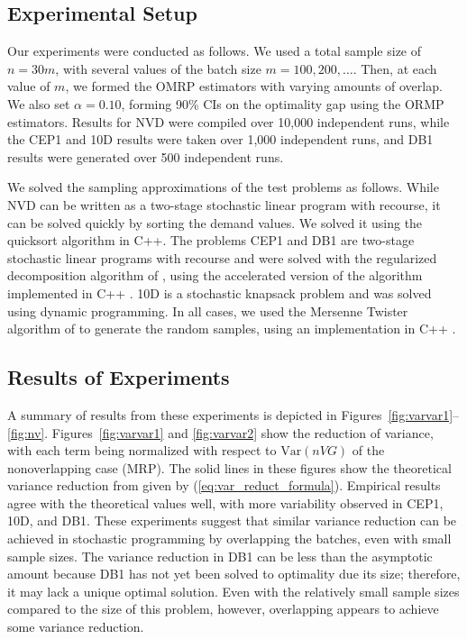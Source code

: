 \documentclass[12pt]{article}
\newcommand{\var}[1]{\mathrm{Var} \left( #1 \right)}
\begin{document}
\subsection{Experimental Setup}
\label{ssec:expS}


Our experiments were conducted as follows. 
We used a total sample size of $n = 30 m$, with several values of the batch size $m=100, 200, \ldots$. 
Then, at each value of $m$, we formed the OMRP estimators with varying amounts of overlap. 
We also set $\alpha=0.10$, forming 90\% CIs on the optimality gap using the ORMP estimators. 
Results for NVD were compiled over 10,000 independent runs, while the CEP1 and 10D results were taken over 1,000 independent runs, and DB1 results were generated over 500 independent runs.

We solved the sampling approximations of the test problems as follows.
While NVD can be written as a two-stage stochastic linear program with recourse, it can be solved quickly by sorting the demand values. 
We solved it using the quicksort algorithm in C++. 
The problems CEP1 and DB1 are two-stage stochastic linear programs with recourse and were solved with the regularized decomposition algorithm of \citet{ruszczynski1986regularized}, using the accelerated version of the algorithm implemented in C++ \citep{ruszczynski1997accelerating}. 
10D is a stochastic knapsack problem and was solved using dynamic programming.  
In all cases, we used the Mersenne Twister algorithm of \citet{matsumoto_nishimura_98} to generate the random samples, using an implementation in C++ \citep{wagner_twister_09}.




\subsection{Results of Experiments}
\label{ssec:results}

A summary of results from these experiments is depicted in Figures~\ref{fig:varvar1}--\ref{fig:nv}.
Figures~\ref{fig:varvar1} and \ref{fig:varvar2} show the reduction of variance, with each term being normalized with respect to $\var{nVG}$ of the nonoverlapping case (MRP). 
The solid lines in these figures show the theoretical variance reduction from \citep{Welch1987} given by (\ref{eq:var_reduct_formula}). 
Empirical results agree with the theoretical values well, with more variability observed in CEP1, 10D, and DB1. 
These experiments suggest that similar variance reduction can be achieved in stochastic programming by overlapping the batches, even with small sample sizes.
The variance reduction in DB1 can be less than the asymptotic amount %
because DB1 has not yet been solved to optimality due its size; therefore, it may lack a unique optimal solution. 
Even with the relatively small sample sizes compared to the size of this problem, however, overlapping appears to achieve some variance reduction. 
\end{document}
